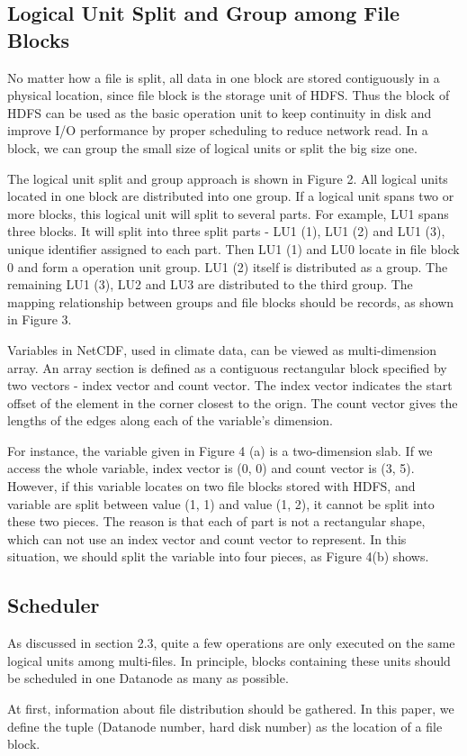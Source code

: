 \documentclass[preprint,12pt]{elsarticle}
\begin{document}
\subsection{Logical Unit Split and Group among File Blocks}
No matter how a file is split, all data in one block are stored contiguously in a physical location, since file block is the storage
unit of HDFS. Thus the block of HDFS can be used as the basic operation unit to keep continuity in disk and improve I/O performance 
by proper scheduling to reduce network read. In a block, we can group the small size of logical units or split the big size one.\par
The logical unit split and group approach is shown in Figure 2. All logical units located in one block are distributed into one group. 
If a logical unit spans two or more blocks, this logical unit will split to several parts. For example, LU1 spans three blocks. It will 
split into three split parts - LU1 (1), LU1 (2) and LU1 (3), unique identifier assigned to each part. Then LU1 (1) and LU0 locate in file
block 0 and form a operation unit group. LU1 (2) itself is distributed as a group. The remaining LU1 (3), LU2 and LU3 are distributed to the 
third group. The mapping relationship between groups and file blocks should be records, as shown in Figure 3. \par
Variables in NetCDF, used in climate data, can be viewed as multi-dimension array. An array section is defined as a contiguous rectangular
block specified by two vectors - index vector and count vector. The index vector indicates the start offset of the element in the corner
closest to the orign. The count vector gives the lengths of the edges along each of the variable's dimension. \par
For instance, the variable given in Figure 4 (a) is a two-dimension slab. If we access the whole variable, index vector is (0, 0) and 
count vector is (3, 5). However, if this variable locates on two file blocks stored with HDFS, and variable are split between value (1, 1) 
and value (1, 2), it cannot be split into these two pieces. The reason is that each of part is not a rectangular shape, which can not use
an index vector and count vector to represent. In this situation, we should split the variable into four pieces, as Figure 4(b) shows.

\subsection{Scheduler}
As discussed in section 2.3, quite a few operations are only executed on the same logical units among multi-files. In principle, blocks 
containing these units should be scheduled in one Datanode as many as possible. \par
At first, information about file distribution should be gathered. In this paper, we define the tuple (Datanode number, hard disk
number) as the location of a file block. 
\end{document}
